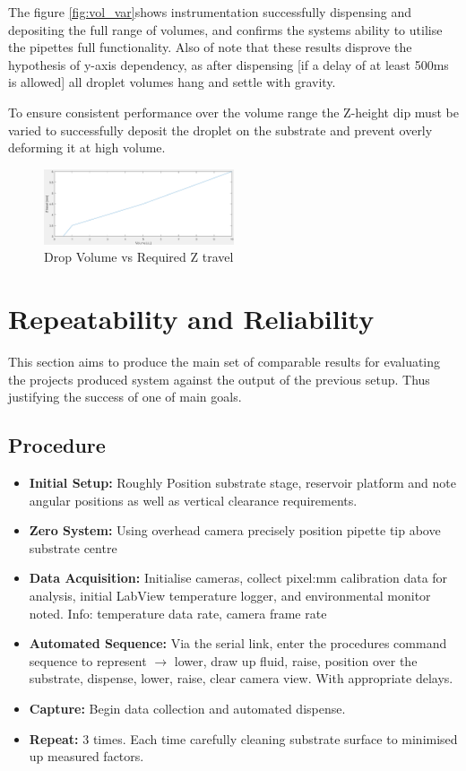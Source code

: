 The figure \ref{fig:vol_var}shows instrumentation successfully dispensing and depositing the full range of volumes, and confirms the systems ability to utilise the pipettes full functionality. Also of note that these results disprove the hypothesis of y-axis dependency, as after dispensing [if a delay of at least 500ms is allowed] all droplet volumes hang and settle with gravity.  

To ensure consistent performance over the volume range the Z-height dip must be varied to successfully deposit the droplet on the substrate and prevent overly deforming it at high volume.

\begin{figure}[h]
    \centering
    \includegraphics[width=0.5\textwidth]{img/vol_z.png}
    \caption{Drop Volume vs Required Z travel}
\end{figure}

\section{Repeatability and Reliability}

This section aims to produce the main set of comparable results for evaluating the projects produced system against the output of the previous setup. Thus justifying the success of one of main goals.

\subsection{Procedure}
\begin{itemize}
    \item \textbf{Initial Setup:} Roughly Position substrate stage, reservoir platform and note angular positions as well as vertical clearance requirements.
    \item \textbf{Zero System:} Using overhead camera precisely position pipette tip above substrate centre
    \item \textbf{Data Acquisition:} Initialise cameras, collect pixel:mm calibration data for analysis, initial LabView temperature logger, and environmental monitor noted. Info: temperature data rate, camera frame rate
    \item \textbf{Automated Sequence:} Via the serial link, enter the procedures command sequence to represent $\rightarrow$ lower, draw up fluid, raise, position over the substrate, dispense, lower, raise, clear camera view. With appropriate delays.
    \item \textbf{Capture:} Begin data collection and automated dispense.
    \item \textbf{Repeat: } 3 times. Each time carefully cleaning substrate surface to minimised up measured factors.
\end{itemize}

